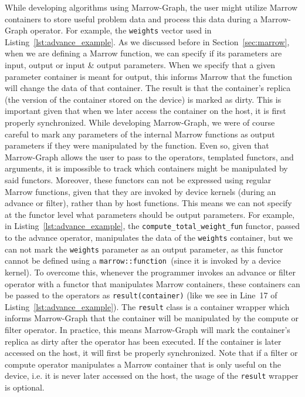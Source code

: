 While developing algorithms using Marrow-Graph, the user might utilize Marrow containers to store useful problem data and process this data during a Marrow-Graph operator. For example, the \texttt{weights} vector used in Listing~\ref{lst:advance_example}. As we discussed before in Section~\ref{sec:marrow}, when we are defining a Marrow function, we can specify if its parameters are input, output or input \& output parameters. When we specify that a given parameter container is meant for output, this informs Marrow that the function will change the data of that container. The result is that the container's replica (the version of the container stored on the device) is marked as dirty. This is important given that when we later access the container on the host, it is first properly synchronized. While developing Marrow-Graph, we were of course careful to mark any parameters of the internal Marrow functions as output parameters if they were manipulated by the function. Even so, given that Marrow-Graph allows the user to pass to the operators, templated functors, and arguments, it is impossible to track which containers might be manipulated by said functors. Moreover, these functors can not be expressed using regular Marrow functions, given that they are invoked by device kernels (during an advance or filter), rather than by host functions. This means we can not specify at the functor level what parameters should be output parameters. For example, in Listing~\ref{lst:advance_example}, the \texttt{compute\_total\_weight\_fun} functor, passed to the advance operator, manipulates the data of the \texttt{weights} container, but we can not mark the \texttt{weights} parameter as an output parameter, as this functor cannot be defined using a \texttt{marrow::function }(since it is invoked by a device kernel). To overcome this, whenever the programmer invokes an advance or filter operator with a functor that manipulates Marrow containers, these containers can be passed to the operators as \texttt{result(container)} (like we see in Line~17 of Listing~\ref{lst:advance_example}). The \texttt{result} class is a container wrapper which informs Marrow-Graph that the container will be manipulated by the compute or filter operator. In practice, this means Marrow-Graph will mark the container's replica as dirty after the operator has been executed. If the container is later accessed on the host, it will first be properly synchronized. Note that if a filter or compute operator manipulates a Marrow container that is only useful on the device, i.e. it is never later accessed on the host, the usage of the \texttt{result} wrapper is optional.

